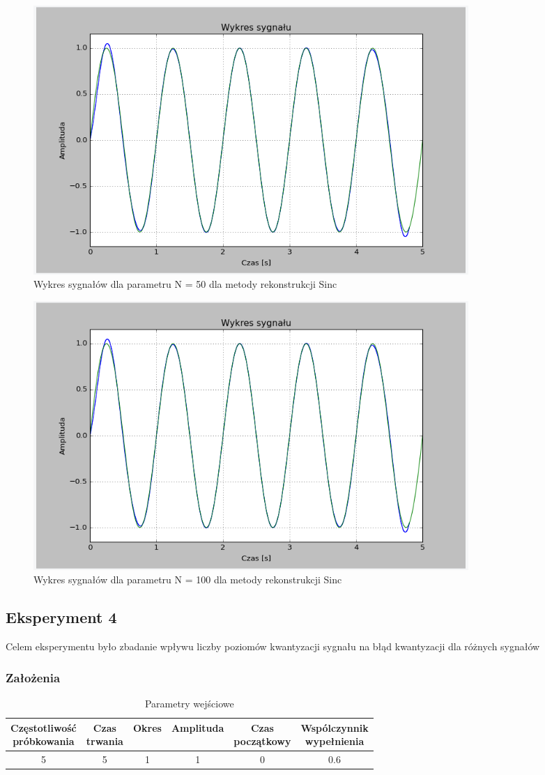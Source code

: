 \documentclass{article}
\begin{document}
    \begin{figure}[h!]
        \centering
        \includegraphics[width=0.8\textwidth]{img/1/sinc25.png}
        \caption{Wykres sygnałów dla parametru N = 50 dla metody rekonstrukcji Sinc}
    \end{figure}
    \FloatBarrier

    \begin{figure}[h!]
        \centering
        \includegraphics[width=0.8\textwidth]{img/1/sinc25.png}
        \caption{Wykres sygnałów dla parametru N = 100 dla metody rekonstrukcji Sinc}
    \end{figure}
    \FloatBarrier
    \subsection{Eksperyment 4}
    Celem eksperymentu było zbadanie wpływu liczby poziomów kwantyzacji sygnału na błąd
    kwantyzacji dla różnych sygnałów

    \subsubsection{Założenia}
    \begin{table}[h!]
        \centering
        \begin{tabular}{|c|c|c|c|c|c|}
            \hline
            \shortstack{Częstotliwość\\ próbkowania} & \shortstack{Czas\\ trwania} & Okres & Amplituda & \shortstack{Czas\\ początkowy} & \shortstack{Wspólczynnik\\ wypełnienia}   \\ \hline
            5 & 5 & 1 & 1 & 0 & 0.6  \\ \hline
        \end{tabular}
        \caption{Parametry wejściowe}
    \end{table}
    
\end{document}
